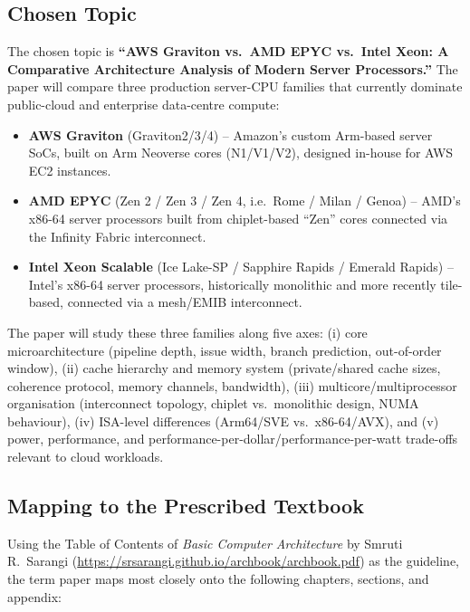 \documentclass[11pt,a4paper]{article}
\begin{document}
\subsection{Chosen Topic}
The chosen topic is \textbf{``AWS Graviton vs.\ AMD EPYC vs.\ Intel Xeon: A Comparative
Architecture Analysis of Modern Server Processors.''} The paper will compare three
production server-CPU families that currently dominate public-cloud and enterprise
data-centre compute:
\begin{itemize}[nosep]
  \item \textbf{AWS Graviton} (Graviton2/3/4) -- Amazon's custom Arm-based server SoCs, built
        on Arm Neoverse cores (N1/V1/V2), designed in-house for AWS EC2 instances.
  \item \textbf{AMD EPYC} (Zen 2 / Zen 3 / Zen 4, i.e.\ Rome / Milan / Genoa) -- AMD's
        x86-64 server processors built from chiplet-based ``Zen'' cores connected via the
        Infinity Fabric interconnect.
  \item \textbf{Intel Xeon Scalable} (Ice Lake-SP / Sapphire Rapids / Emerald Rapids) --
        Intel's x86-64 server processors, historically monolithic and more recently
        tile-based, connected via a mesh/EMIB interconnect.
\end{itemize}
The paper will study these three families along five axes: (i) core microarchitecture
(pipeline depth, issue width, branch prediction, out-of-order window), (ii) cache hierarchy
and memory system (private/shared cache sizes, coherence protocol, memory channels,
bandwidth), (iii) multicore/multiprocessor organisation (interconnect topology, chiplet vs.\
monolithic design, NUMA behaviour), (iv) ISA-level differences (Arm64/SVE vs.\ x86-64/AVX),
and (v) power, performance, and performance-per-dollar/performance-per-watt trade-offs
relevant to cloud workloads.

\subsection{Mapping to the Prescribed Textbook}
Using the Table of Contents of \emph{Basic Computer Architecture} by Smruti R.\ Sarangi
(\url{https://srsarangi.github.io/archbook/archbook.pdf}) as the guideline, the term paper
maps most closely onto the following chapters, sections, and appendix:
\end{document}
